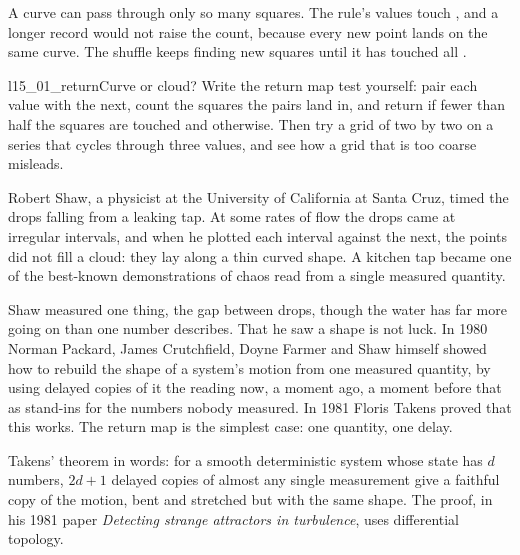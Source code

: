 

\noindent
A curve can pass through only so many squares. The rule's 
values touch , and a longer record would not raise the
count, because every new point lands on the same curve. The shuffle keeps
finding new squares until it has touched all .

\begin{lab}{l15_01_return}{Curve or cloud?}
Write the return map test yourself: pair each value with the next, count the
squares the pairs land in, and return  if fewer than half the
squares are touched and  otherwise. Then try a grid of two by
two on a series that cycles through three values, and see how a grid that is
too coarse misleads.
\end{lab}

\begin{worldbox}
Robert Shaw, a physicist at the University of California at Santa Cruz,
timed the drops falling from a leaking tap. At some rates of flow the drops
came at irregular intervals, and when he plotted each interval against the
next, the points did not fill a cloud: they lay along a thin curved shape. A
kitchen tap became one of the best-known demonstrations of chaos read from a
single measured quantity.
\end{worldbox}

\noindent
Shaw measured one thing, the gap between drops, though the water has far more
going on than one number describes. That he saw a shape is not luck. In 1980
Norman Packard, James Crutchfield, Doyne Farmer and Shaw himself showed how
to rebuild the shape of a system's motion from one measured quantity, by
using delayed copies of it \dash{} the reading now, a moment ago, a moment
before that \dash{} as stand-ins for the numbers nobody measured. In 1981
Floris Takens proved that this works. The return map is the simplest case:
one quantity, one delay.

\begin{rigourbox}
Takens' theorem in words: for a smooth deterministic system whose state has
$d$ numbers, $2d + 1$ delayed copies of almost any single measurement give a
faithful copy of the motion, bent and stretched but with the same shape. The
proof, in his 1981 paper \emph{Detecting strange attractors in turbulence},
uses differential topology.
\end{rigourbox}

